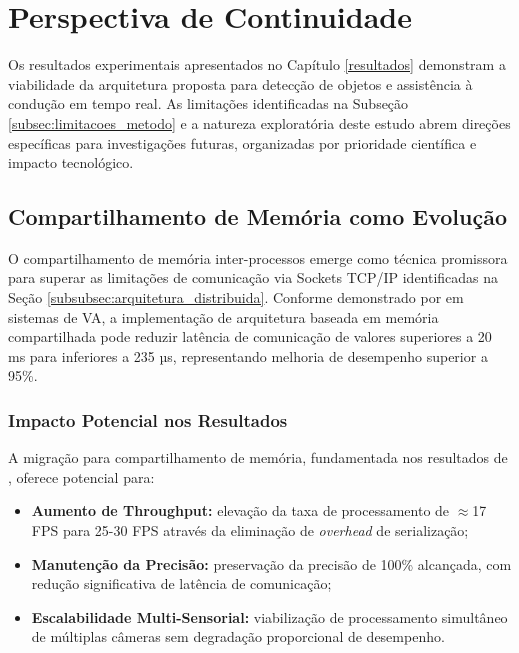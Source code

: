 \chapter{Perspectiva de Continuidade} \label{continuidade}

Os resultados experimentais apresentados no Capítulo \ref{resultados} demonstram a viabilidade da arquitetura proposta para detecção de objetos e assistência à condução em tempo real. As limitações identificadas na Subseção \ref{subsec:limitacoes_metodo} e a natureza exploratória deste estudo abrem direções específicas para investigações futuras, organizadas por prioridade científica e impacto tecnológico.

\section{Compartilhamento de Memória como Evolução}

O compartilhamento de memória inter-processos emerge como técnica promissora para superar as limitações de comunicação via Sockets TCP/IP identificadas na Seção \ref{subsubsec:arquitetura_distribuida}. Conforme demonstrado por  em sistemas de VA, a implementação de arquitetura baseada em memória compartilhada pode reduzir latência de comunicação de valores superiores a 20 ms para inferiores a 235 µs, representando melhoria de desempenho superior a 95\%.

\subsection{Impacto Potencial nos Resultados}

A migração para compartilhamento de memória, fundamentada nos resultados de , oferece potencial para:

\begin{itemize}
\item \textbf{Aumento de Throughput:} elevação da taxa de processamento de $\approx$17 FPS para 25-30 FPS através da eliminação de \textit{overhead} de serialização;
\item \textbf{Manutenção da Precisão:} preservação da precisão de 100\% alcançada, com redução significativa de latência de comunicação;
\item \textbf{Escalabilidade Multi-Sensorial:} viabilização de processamento simultâneo de múltiplas câmeras sem degradação proporcional de desempenho.
\end{itemize}


